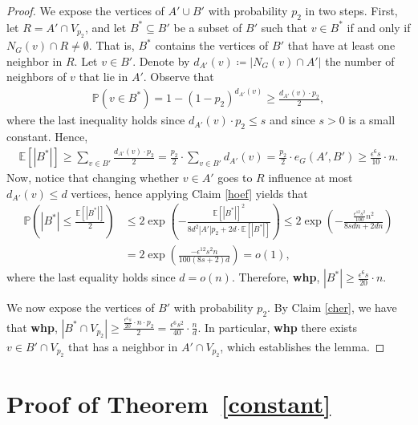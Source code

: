 \documentclass[notitlepage]{scrartcl}
\begin{document}
\begin{proof}
    We expose the vertices of $A'\cup B'$ with probability $p_2$ in two steps. First, let $R=A'\cap V_{p_2}$, and let $B^*\subseteq B'$ be a subset of $B'$ such that $v\in B^*$ if and only if $N_G(v)\cap R\ne \emptyset$. That is, $B^*$ contains the vertices of $B'$ that have at least one neighbor in $R$. Let $v\in B'$. Denote by $d_{A'}(v)\coloneqq |N_G(v)\cap A'|$ the number of neighbors of $v$ that lie in $A'$. Observe that
    \begin{align*}
        \mathbb{P}(v\in B^*)=1-(1-p_2)^{d_{A'}(v)}\ge \frac{d_{A'}(v)\cdot p_2}{2},
    \end{align*}
    where the last inequality holds since $d_{A'}(v)\cdot p_2\le s$ and since $s>0$ is a small constant.
    Hence, 
    \begin{align*}
        \mathbb{E}[|B^*|]\ge \sum_{v\in B'}\frac{d_{A'}(v)\cdot p_2}{2}=\frac{p_2}{2}\cdot \sum_{v\in B'}d_{A'}(v)=\frac{p_2}{2}\cdot e_G(A',B')\ge \frac{\epsilon^6 s}{10}\cdot n.
    \end{align*}
    Now, notice that changing whether $v\in A'$ goes to $R$ influence at most $d_{A'}(v)\le d$ vertices, hence applying Claim \ref{hoef} yields that
    \begin{align*}
        \mathbb{P}\left(|B^*|\le\frac{\mathbb{E}[|B^*|]}{2}\right)&\le 2\exp\left(-\frac{\mathbb{E}[|B^*|]^2}{8d^2|A'|p_2+2d\cdot \mathbb{E}[|B^*|]}\right)\le 2\exp\left(-\frac{\frac{\epsilon^{12}s^2}{100}n^2}{8sdn+2dn}\right)\\
        &=2\exp\left(\frac{-\epsilon^{12}s^2n}{100(8s+2)d}\right)=o(1),
    \end{align*}
    where the last equality holds since $d=o(n)$. Therefore, \textbf{whp}, $|B^*|\ge \frac{\epsilon^6 s}{20}\cdot n$.

    We now expose the vertices of $B'$ with probability $p_2$. By Claim \ref{cher}, we have that \textbf{whp}, $|B^*\cap V_{p_2}|\ge \frac{\frac{\epsilon^6 s}{20}\cdot n\cdot p_2}{2}=\frac{\epsilon^6 s^2}{40}\cdot \frac{n}{d}$. In particular, \textbf{whp} there exists $v\in B'\cap V_{p_2}$ that has a neighbor in $A'\cap V_{p_2}$, which establishes the lemma.
\end{proof}

\section{Proof of Theorem~\ref{constant}}\label{Pconstant}
\end{document}
